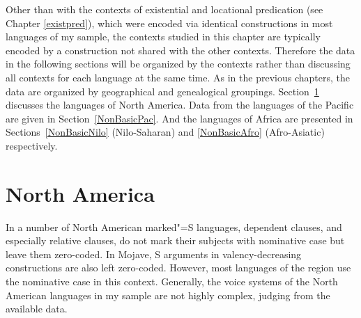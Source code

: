 
Other than with the contexts of existential and locational predication (see Chapter \ref{existpred}), which were encoded via identical constructions in most languages of my sample, the contexts studied in this chapter are typically encoded by a construction not shared with the other contexts.
Therefore the data in the following sections will be organized by the contexts rather than discussing all contexts for each language at the same time.
As in the previous chapters, the data are organized by geographical and genealogical groupings. 
Section~\ref{NonBasicNA} discusses the languages of North America. Data from the languages of the Pacific are given in Section~\ref{NonBasicPac}. 
And the languages of Africa are presented in Sections~\ref{NonBasicNilo} (Nilo-Saharan) and \ref{NonBasicAfro} (Afro-Asiatic) respectively.

\section{North America}\label{NonBasicNA}

In a number of North American marked"=S languages, dependent clauses, and especially relative clauses, do not mark their subjects with nominative case but leave them zero-coded. 
In Mojave, S arguments in valency-decreasing constructions are also left zero-coded. 
However, most languages of the region use the nominative  case in this context. 
Generally, the voice systems of the North American languages in my sample are not highly complex, judging from the available data. %

